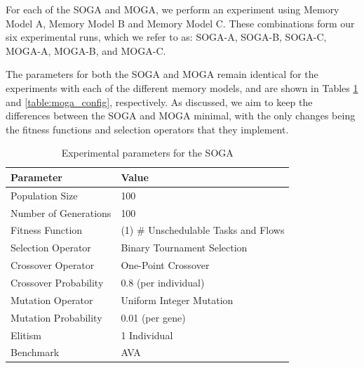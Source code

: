 \documentclass[conference]{IEEEtran}
\begin{document}
For each of the SOGA and MOGA, we perform an experiment using Memory Model A, Memory Model B and Memory Model C. These combinations form our six experimental runs, which we refer to as: SOGA-A, SOGA-B, SOGA-C, MOGA-A, MOGA-B, and MOGA-C.

The parameters for both the SOGA and MOGA remain identical for the experiments with each of the different memory models, and are shown in Tables \ref{table:soga_config} and \ref{table:moga_config}, respectively. As discussed, we aim to keep the differences between the SOGA and MOGA minimal, with the only changes being the fitness functions and selection operators that they implement. 

\vspace{-2ex}
	\begin{table}[!h] \centering
		\caption{Experimental parameters for the SOGA}
		\footnotesize\begin{tabularx}{0.48\textwidth}{ll}
			\toprule
			Parameter & Value \\
			\midrule
			Population Size & 100 \\
			Number of Generations & 100 \\
			Fitness Function & (1) \# Unschedulable Tasks and Flows \\
			Selection Operator & Binary Tournament Selection \\
			Crossover Operator & One-Point Crossover \\
			Crossover Probability & 0.8 (per individual) \\
			Mutation Operator & Uniform Integer Mutation \\
			Mutation Probability & 0.01 (per gene) \\
			Elitism & 1 Individual \\
			Benchmark & AVA \\
			\bottomrule
		\end{tabularx}
	
		\label{table:soga_config}
	\end{table}
\vspace{-4ex}
\end{document}
